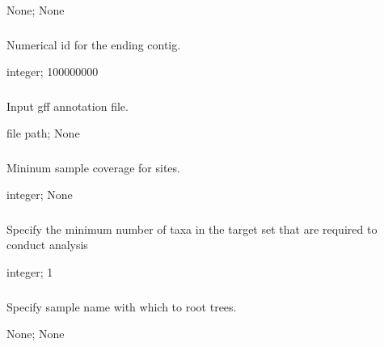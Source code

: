 \documentclass[letterpaper,11pt,english]{sphinxmanual}
\begin{document}
 None;  None


\subsubsection{}
\label{\detokenize{prog_desc:end-contig-endcontig}}
 Numerical id for the ending contig.

 integer;  100000000


\subsubsection{}
\label{\detokenize{prog_desc:id101}}
 Input gff annotation file.

 file path;  None


\subsubsection{}
\label{\detokenize{prog_desc:id102}}
 Mininum sample coverage for sites.

 integer;  None


\subsubsection{}
\label{\detokenize{prog_desc:num-target-species-targetspec}}
 Specify the minimum number of taxa in the target set that are required to conduct analysis

 integer;  1


\subsubsection{}
\label{\detokenize{prog_desc:outgroup}}
 Specify sample name with which to root trees.

 None;  None
\end{document}
